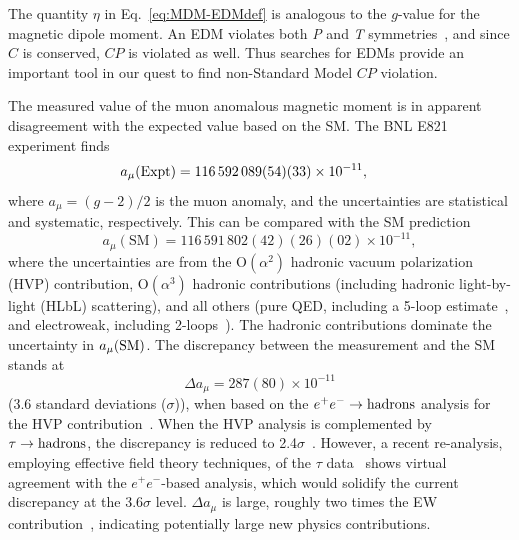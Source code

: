 The quantity $\eta$ in Eq.~\ref{eq:MDM-EDMdef}
 is analogous to the $g$-value for the magnetic dipole
moment. An EDM violates both {\sl P} and {\sl T}
symmetries~\cite{Purcell50,Landau57,Ramsey58}, and since $C$ is conserved,  ${ C\!P}$ is violated as well.  Thus
searches for EDMs provide an important tool in our quest to
find non-Standard Model ${ C\!P}$ violation.

The measured value of the muon anomalous magnetic moment is in apparent
disagreement with the expected value based on the
SM.  The BNL E821 experiment finds~\cite{hep-ex/0602035}
\begin{equation} \hspace*{-23pt}
    a_\mu(\textrm{Expt}) = 116\,592\,089(54)(33)\times10^{-11},
    \label{eq:e821}
\end{equation}
where $a_\mu=(g-2)/2$ is the muon anomaly, and the uncertainties are
statistical and systematic, respectively.  This can be compared with
the SM prediction~\cite{arXiv:1010.4180,931465}
\begin{equation}
    a_\mu(\textrm{SM})   = 116\,591\,802(42)(26)(02)\times10^{-11},
    \label{eq:SM}
\end{equation}
where the uncertainties are from the $\mathrm{O}(\alpha^2)$ hadronic vacuum
polarization (HVP) contribution, $\mathrm{O}(\alpha^3)$ hadronic
contributions (including hadronic light-by-light (HLbL) scattering),
and all others (pure QED, including a 5-loop
estimate~\cite{arXiv:1110.2826}, and electroweak, including
2-loops~\cite{hep-ph/0212229}). The hadronic contributions dominate
the uncertainty in $a_\mu(\rm SM)$.  The discrepancy between the
measurement and the SM stands at
\begin{equation}
\Delta a_\mu=287(80)\times 10^{-11}
\end{equation}
(3.6 standard deviations ($\sigma$)), when based on the $e^+e^-\to\rm
hadrons$ analysis for the HVP
contribution~\cite{arXiv:1010.4180}. When the HVP analysis is
complemented by $\tau\to\rm hadrons$, the discrepancy is reduced to
2.4$\sigma$~\cite{arXiv:1010.4180}. However, a recent re-analysis,
employing effective field theory techniques, of the $\tau$
data~\cite{arXiv:1101.2872} shows virtual agreement with the
$e^+e^-$-based analysis, which would solidify the current discrepancy
at the 3.6$\sigma$ level. $\Delta a_\mu$ is large, roughly two times
the EW contribution~\cite{hep-ph/0212229}, indicating potentially
large new physics contributions.





